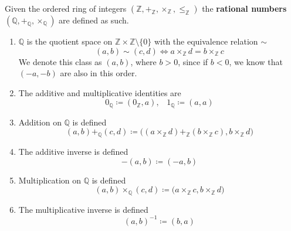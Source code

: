 \documentclass{article}
\begin{document}
      \begin{definition}[Rationals]
        Given the ordered ring of integers $(\mathbb{Z}, +_{\mathbb{Z}}, \times_{\mathbb{Z}}, \leq_{\mathbb{Z}})$ the \textbf{rational numbers} $(\mathbb{Q}, +_{\mathbb{Q}}, \times_{\mathbb{Q}})$ are defined as such. 
        \begin{enumerate}
          \item $\mathbb{Q}$ is the quotient space on $\mathbb{Z} \times \mathbb{Z} \setminus \{0\}$ with the equivalence relation $\sim$ 
          \begin{equation}
            (a, b) \sim (c, d) \iff a \times_{\mathbb{Z}} d = b \times_{\mathbb{Z}} c
          \end{equation} 
          We denote this class as $(a, b)$, where $b > 0$, since if $b < 0$, we know that $(-a, -b)$ are also in this order. 

          \item The additive and multiplicative identities are 
          \begin{equation}
            0_{\mathbb{Q}} \coloneqq (0_{\mathbb{Z}}, a), \;\;\; 1_{\mathbb{Q}} \coloneqq (a, a)
          \end{equation}

          \item Addition on $\mathbb{Q}$ is defined 
          \begin{equation}
            (a, b) +_{\mathbb{Q}} (c, d) \coloneqq \big( (a \times_{\mathbb{Z}} d) +_{\mathbb{Z}} (b \times_{\mathbb{Z}} c), b \times_{\mathbb{Z}} d \big) 
          \end{equation}

          \item The additive inverse is defined 
          \begin{equation}
            -(a, b) \coloneqq (-a, b)
          \end{equation}

          \item Multiplication on $\mathbb{Q}$ is defined 
          \begin{equation}
            (a, b) \times_{\mathbb{Q}} (c, d) \coloneqq \big( a \times_{\mathbb{Z}} c, b \times_{\mathbb{Z}} d \big)
          \end{equation} 

          \item The multiplicative inverse is defined 
          \begin{equation}
            (a, b)^{-1} \coloneqq (b, a)
          \end{equation}
        \end{enumerate}
      \end{definition}
\end{document}

